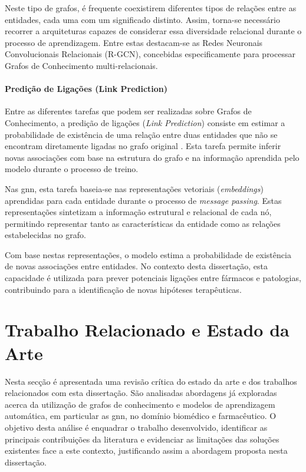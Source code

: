 Neste tipo de grafos, é frequente coexistirem diferentes tipos de relações entre as entidades, cada uma com um significado distinto. Assim, torna-se necessário recorrer a arquiteturas capazes de considerar essa diversidade relacional durante o processo de aprendizagem. Entre estas destacam-se as Redes Neuronais Convolucionais Relacionais (R-GCN), concebidas especificamente para processar Grafos de Conhecimento multi-relacionais.

\paragraph{Predição de Ligações (Link Prediction)}
\label{subsec:predicao de ligacoes}
Entre as diferentes tarefas que podem ser realizadas sobre Grafos de Conhecimento, a predição de ligações (\textit{Link Prediction}) consiste em estimar a probabilidade de existência de uma relação entre duas entidades que não se encontram diretamente ligadas no grafo original \cite{Wu2021}. Esta tarefa permite inferir novas associações com base na estrutura do grafo e na informação aprendida pelo modelo durante o processo de treino.

Nas \acrshort{gnn}, esta tarefa baseia-se nas representações vetoriais (\textit{embeddings}) aprendidas para cada entidade durante o processo de \textit{message passing}. Estas representações sintetizam a informação estrutural e relacional de cada nó, permitindo representar tanto as características da entidade como as relações estabelecidas no grafo.

Com base nestas representações, o modelo estima a probabilidade de existência de novas associações entre entidades. No contexto desta dissertação, esta capacidade é utilizada para prever potenciais ligações entre fármacos e patologias, contribuindo para a identificação de novas hipóteses terapêuticas.

\section{Trabalho Relacionado e Estado da Arte}
\label{sec:related and art}
Nesta secção é apresentada uma revisão crítica do estado da arte e dos trabalhos relacionados com esta dissertação. São analisadas abordagens já exploradas acerca da utilização de grafos de conhecimento e modelos de aprendizagem automática, em particular as \acrshort{gnn}, no domínio biomédico e farmacêutico. O objetivo desta análise é enquadrar o trabalho desenvolvido, identificar as principais contribuições da literatura e evidenciar as limitações das soluções existentes face a este contexto, justificando assim a abordagem proposta nesta dissertação.

